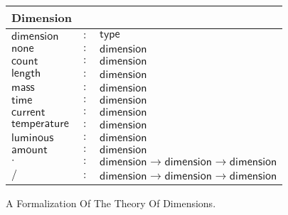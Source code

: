 \begin{figure}[h]
  \begin{center}
    \begin{tabular}{|l c l|}
      \hline
      \textsf{Dimension} & &\\\hline
      $\mathsf{dimension}$ & $:$ & $ \mathsf{type}$\\

      $\mathsf{none}$ & $:$ & $ \mathsf{dimension}$\\
      $\mathsf{count}$ & $:$ & $ \mathsf{dimension}$\\
      $\mathsf{length}$ & $:$ & $ \mathsf{dimension}$\\
      $\mathsf{mass}$ & $:$ & $ \mathsf{dimension}$\\
      $\mathsf{time}$ & $:$ & $ \mathsf{dimension}$\\
      $\mathsf{current}$ & $:$ & $ \mathsf{dimension}$\\
      $\mathsf{temperature}$ & $:$ & $ \mathsf{dimension}$\\
      $\mathsf{luminous}$ & $:$ & $ \mathsf{dimension}$\\
      $\mathsf{amount}$ & $:$ & $ \mathsf{dimension}$\\

      $\cdot{}$ & $:$ & $ \mathsf{dimension} \rightarrow \mathsf{dimension} \rightarrow \mathsf{dimension}$\\
      $/$ & $:$ & $ \mathsf{dimension} \rightarrow \mathsf{dimension} \rightarrow \mathsf{dimension}$\\\hline
    \end{tabular}
  \end{center}
  \caption{A Formalization Of The Theory Of Dimensions. }
  \label{fig:dimensions}
\end{figure}
